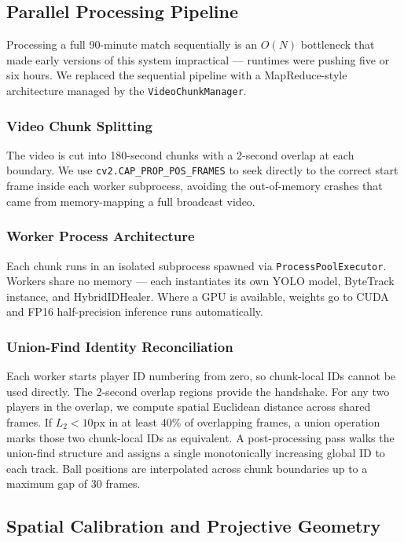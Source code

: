 \documentclass[conference]{IEEEtran}
\begin{document}
\subsection{Parallel Processing Pipeline}

Processing a full 90-minute match sequentially is an $O(N)$ bottleneck that made early versions of this system impractical --- runtimes were pushing five or six hours. We replaced the sequential pipeline with a MapReduce-style architecture managed by the \texttt{VideoChunkManager}.

\subsubsection{Video Chunk Splitting}
The video is cut into 180-second chunks with a 2-second overlap at each boundary. We use \texttt{cv2.CAP\_PROP\_POS\_FRAMES} to seek directly to the correct start frame inside each worker subprocess, avoiding the out-of-memory crashes that came from memory-mapping a full broadcast video.

\subsubsection{Worker Process Architecture}
Each chunk runs in an isolated subprocess spawned via \texttt{ProcessPoolExecutor}. Workers share no memory --- each instantiates its own YOLO model, ByteTrack instance, and HybridIDHealer. Where a GPU is available, weights go to CUDA and FP16 half-precision inference runs automatically.

\subsubsection{Union-Find Identity Reconciliation}
Each worker starts player ID numbering from zero, so chunk-local IDs cannot be used directly. The 2-second overlap regions provide the handshake. For any two players in the overlap, we compute spatial Euclidean distance across shared frames. If $L_2 < 10\text{px}$ in at least 40\% of overlapping frames, a union operation marks those two chunk-local IDs as equivalent. A post-processing pass walks the union-find structure and assigns a single monotonically increasing global ID to each track. Ball positions are interpolated across chunk boundaries up to a maximum gap of 30 frames.

\subsection{Spatial Calibration and Projective Geometry}
\end{document}
